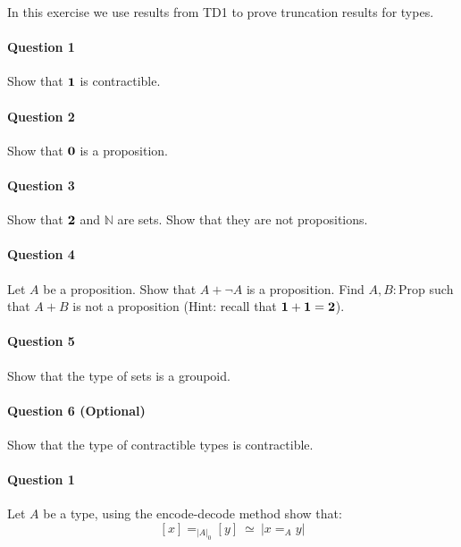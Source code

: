 \documentclass{article}[6pt]%
\newcommand{\one}{{\bf 1}}
\newcommand{\zero}{{\bf 0}}
\newcommand{\two}{{\bf 2}}
\newcommand{\Prop}{\mathrm{Prop}}
\begin{document}
\begin{Exercise}
In this exercise we use results from TD1 to prove truncation results for types.

\paragraph{Question 1} Show that $\one$ is contractible. %

\paragraph{Question 2} Show that $\zero$ is a proposition.

\paragraph{Question 3} Show that $\two$ and $\mathbb{N}$ are sets. Show that they are not propositions.

\paragraph{Question 4} Let $A$ be a proposition. Show that $A+ \lnot A$ is a proposition. Find $A,B:\Prop$ such that $A+B$ is not a proposition (Hint: recall that $\one+\one = \two$).

\paragraph{Question 5} Show that the type of sets is a groupoid.

\paragraph{Question 6 (Optional)} Show that the type of contractible types is contractible.

\end{Exercise}


\begin{Exercise}[title={Identity types in set-truncations}]
\paragraph{Question 1} Let $A$ be a type, using the encode-decode method show that: 
\[[x]=_{|A|_0}[y]\ \simeq \ |x=_A y|\]
\end{Exercise}
\end{document}
